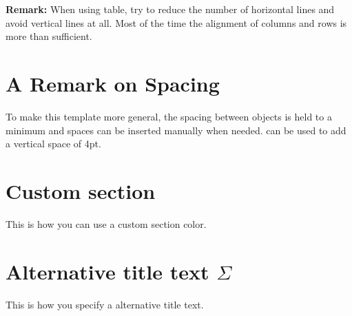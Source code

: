 \documentclass[\fontheight]{extarticle}
\begin{document}
\begin{multicols*}{3}
    \textbf{Remark:} When using table, try to reduce the number of horizontal lines and avoid vertical lines at all.
    Most of the time the alignment of columns and rows is more than sufficient.

    \section{A Remark on Spacing}
    To make this template more general, the spacing between objects is held to a minimum and spaces can be inserted manually when needed.
     can be used to add a vertical space of 4pt.


    \section[][customSectionColor]{Custom section}
    This is how you can use a custom section color.

    \section[Alternative title text Sigma]{Alternative title text $\Sigma$}
    This is how you specify a alternative title text.

    \tableofcontents


\end{multicols*}
\end{document}
